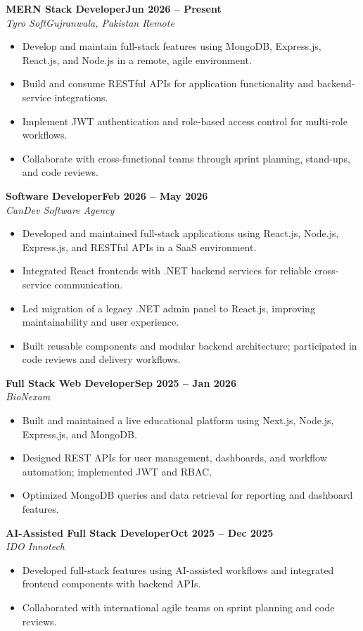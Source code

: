 \documentclass[10pt,a4paper]{article}
\newcommand{\resumeSubheading}[4]{%
  \textbf{#1}\hfill \textbf{#2}\\
  \textit{#3}\hfill \textit{#4}\\[-2pt]
}
\begin{document}
\resumeSubheading{MERN Stack Developer}{Jun 2026 -- Present}{Tyro Soft}{Gujranwala, Pakistan \textbar{} Remote}
\begin{itemize}
  \item Develop and maintain full-stack features using MongoDB, Express.js, React.js, and Node.js in a remote, agile environment.
  \item Build and consume RESTful APIs for application functionality and backend-service integrations.
  \item Implement JWT authentication and role-based access control for multi-role workflows.
  \item Collaborate with cross-functional teams through sprint planning, stand-ups, and code reviews.
\end{itemize}

\resumeSubheading{Software Developer}{Feb 2026 -- May 2026}{CanDev Software Agency}{}
\begin{itemize}
  \item Developed and maintained full-stack applications using React.js, Node.js, Express.js, and RESTful APIs in a SaaS environment.
  \item Integrated React frontends with .NET backend services for reliable cross-service communication.
  \item Led migration of a legacy .NET admin panel to React.js, improving maintainability and user experience.
  \item Built reusable components and modular backend architecture; participated in code reviews and delivery workflows.
\end{itemize}

\resumeSubheading{Full Stack Web Developer}{Sep 2025 -- Jan 2026}{BioNexam}{}
\begin{itemize}
  \item Built and maintained a live educational platform using Next.js, Node.js, Express.js, and MongoDB.
  \item Designed REST APIs for user management, dashboards, and workflow automation; implemented JWT and RBAC.
  \item Optimized MongoDB queries and data retrieval for reporting and dashboard features.
\end{itemize}

\resumeSubheading{AI-Assisted Full Stack Developer}{Oct 2025 -- Dec 2025}{IDO Innotech}{}
\begin{itemize}
  \item Developed full-stack features using AI-assisted workflows and integrated frontend components with backend APIs.
  \item Collaborated with international agile teams on sprint planning and code reviews.
\end{itemize}
\end{document}

